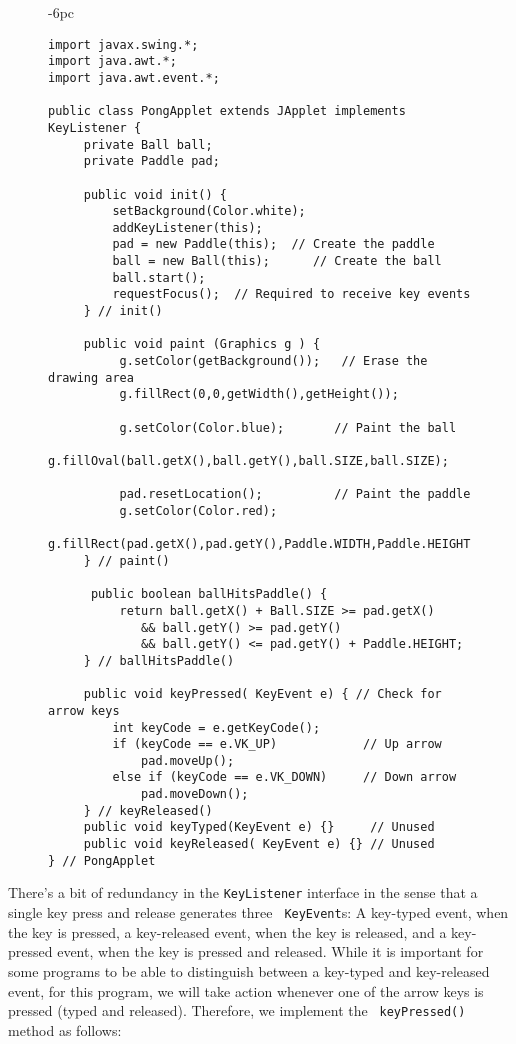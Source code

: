 \begin{figure}[p]
\jjjprogstart
\begin{jjjlistingleft}[32pc]{-6pc}
\begin{lstlisting}
import javax.swing.*;
import java.awt.*;
import java.awt.event.*;

public class PongApplet extends JApplet implements KeyListener {
     private Ball ball;
     private Paddle pad;

     public void init() {
         setBackground(Color.white);
         addKeyListener(this);
         pad = new Paddle(this);  // Create the paddle
         ball = new Ball(this);      // Create the ball
         ball.start();
         requestFocus();  // Required to receive key events
     } // init()

     public void paint (Graphics g ) {
          g.setColor(getBackground());   // Erase the drawing area
          g.fillRect(0,0,getWidth(),getHeight());

          g.setColor(Color.blue);       // Paint the ball
          g.fillOval(ball.getX(),ball.getY(),ball.SIZE,ball.SIZE);

          pad.resetLocation();          // Paint the paddle
          g.setColor(Color.red);
          g.fillRect(pad.getX(),pad.getY(),Paddle.WIDTH,Paddle.HEIGHT);
     } // paint()

      public boolean ballHitsPaddle() {
          return ball.getX() + Ball.SIZE >= pad.getX()
             && ball.getY() >= pad.getY()
             && ball.getY() <= pad.getY() + Paddle.HEIGHT;
     } // ballHitsPaddle()

     public void keyPressed( KeyEvent e) { // Check for arrow keys
         int keyCode = e.getKeyCode();
         if (keyCode == e.VK_UP)            // Up arrow
             pad.moveUp();
         else if (keyCode == e.VK_DOWN)     // Down arrow
             pad.moveDown();
     } // keyReleased()
     public void keyTyped(KeyEvent e) {}     // Unused
     public void keyReleased( KeyEvent e) {} // Unused
} // PongApplet
\end{lstlisting}
\end{jjjlistingleft}
\end{figure}

There's a bit of redundancy in the {\tt KeyListener} interface in the
sense that a single key press and release generates three {\tt
KeyEvent}s: A key-typed event, when the key is pressed, a key-released
event, when the key is released, and a key-pressed event, when the key
is pressed and released.  While it is important for some programs to
be able to distinguish between a key-typed and key-released event, for
this program, we will take action whenever one of the arrow keys is
pressed (typed and released). Therefore, we implement the {\tt
keyPressed()} method as follows:

